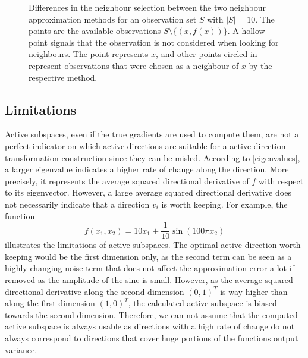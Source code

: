 \documentclass[
  a4paper,  %
  twoside,  %
  bibliography=totoc,
  headsepline,
  cleardoublepage=empty,
  parskip=half,
  draft=false
]{scrbook}
\begin{document}
\begin{mdframed}[style=style]
\begin{figure}[H]
\begin{subfigure}{.45\textwidth}
  \vspace{2mm}
  \label{fig:as_nn}
\end{subfigure}
\delimit
\caption{Differences in the neighbour selection between the two neighbour approximation methods for an observation set $S$ with $|S|=10$.
The \darkblue points are the available observations $S \setminus \{(x, f(x))\}$.
A hollow point signals that the observation is not considered when looking for neighbours.
The \red point represents $x$, and other points circled in \red represent observations that were chosen as a neighbour of $x$ by the respective method.}
\label{fig:as_approx}
\end{figure}
\end{mdframed}

\subsection{Limitations}
\label{sec:asl}

Active subspaces, even if the true gradients are used to compute them, are not a perfect indicator on which active directions are suitable for a active direction transformation construction since they can be misled.
According to \cref{eigenvalues}, a larger eigenvalue indicates a higher rate of change along the direction.
More precisely, it represents the average squared directional derivative of $f$ with respect to its eigenvector.
However, a large average squared directional derivative does not necessarily indicate that a direction $v_i$ is worth keeping.
For example, the function
\begin{equation}
f(x_1, x_2)=10x_1 + \frac{1}{10} \sin(100 \pi x_2)
\end{equation}
illustrates the limitations of active subspaces.
The optimal active direction worth keeping would be the first dimension only, as the second term can be seen as a highly changing noise term that does not affect the approximation error a lot if removed as the amplitude of the sine is small.
However, as the average squared directional derivative along the second dimension $(0,1)^T$ is way higher than along the first dimension $(1,0)^T$, the calculated active subspace is biased towards the second dimension.
Therefore, we can not assume that the computed active subspace is always usable as directions with a high rate of change do not always correspond to directions that cover huge portions of the functions output variance.
\end{document}
